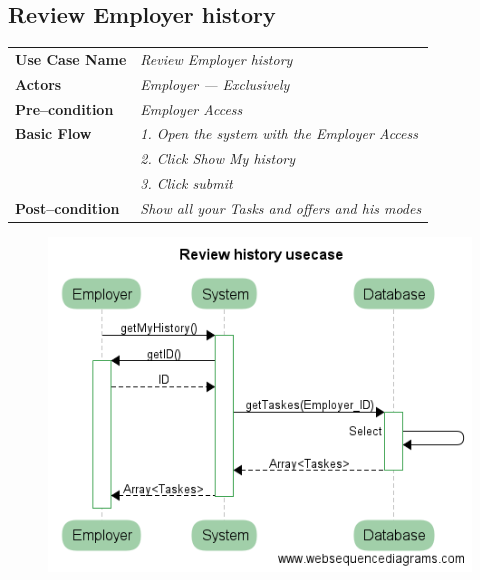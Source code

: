 \documentclass{article}
\begin{document}
\newpage
\subsection{Review Employer history}
    \begin{tabular}{ l | l }
    \toprule
      \rowcolor{LightCyan}
      \textbf{Use Case Name}    & \textit{Review Employer history}\\
      \textbf{Actors}           & \textit{Employer --- Exclusively}\\
      \rowcolor{LightCyan}
      \textbf{Pre--condition}   & \textit{Employer Access}\\
      \textbf{Basic Flow}       & \textit{1. Open the system with the Employer Access}\\
                                & \textit{2. Click Show My history}\\
                                & \textit{3. Click submit}\\
      \rowcolor{LightCyan}
      \textbf{Post--condition}  & \textit{Show all your Tasks and offers and his modes}\\
    \toprule
    \end{tabular}

\begin{figure}[ht!]
\centering
\includegraphics[width=128mm]{Review_history_usecase.png}
\end{figure}


\newpage
\end{document}
